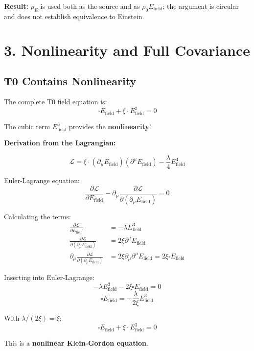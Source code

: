 	\textbf{Result:} $\rho_E$ is used both as the source and as $\rho_0 E_{\text{field}}$; the argument is circular and does not establish equivalence to Einstein.
	
	\section*{3. Nonlinearity and Full Covariance}
	
	\subsection*{\textbf{T0 Contains Nonlinearity}}
	
	The complete T0 field equation is:
	\[
	\boxed{\square E_{\text{field}} + \xi \cdot E_{\text{field}}^3 = 0}
	\]
	
	The cubic term $E_{\text{field}}^3$ provides the \textbf{nonlinearity}!
	
	\textbf{Derivation from the Lagrangian:}
	
	\[
	\mathcal{L} = \xi \cdot (\partial_\mu E_{\text{field}})(\partial^\mu E_{\text{field}}) - \frac{\lambda}{4} E_{\text{field}}^4
	\]
	
	Euler-Lagrange equation:
	\[
	\frac{\partial \mathcal{L}}{\partial E_{\text{field}}} - \partial_\mu \frac{\partial \mathcal{L}}{\partial(\partial_\mu E_{\text{field}})} = 0
	\]
	
	Calculating the terms:
	\begin{align*}
		\frac{\partial \mathcal{L}}{\partial E_{\text{field}}} &= -\lambda E_{\text{field}}^3 \\
		\frac{\partial \mathcal{L}}{\partial(\partial_\mu E_{\text{field}})} &= 2\xi \partial^\mu E_{\text{field}} \\
		\partial_\mu \frac{\partial \mathcal{L}}{\partial(\partial_\mu E_{\text{field}})} &= 2\xi \partial_\mu \partial^\mu E_{\text{field}} = 2\xi \square E_{\text{field}}
	\end{align*}
	
	Inserting into Euler-Lagrange:
	\[
	-\lambda E_{\text{field}}^3 - 2\xi \square E_{\text{field}} = 0
	\]
	\[
	\square E_{\text{field}} = -\frac{\lambda}{2\xi} E_{\text{field}}^3
	\]
	
	With $\lambda/(2\xi) = \xi$:
	\[
	\boxed{\square E_{\text{field}} + \xi \cdot E_{\text{field}}^3 = 0}
	\]
	
	This is a \textbf{nonlinear Klein-Gordon equation}.
	
